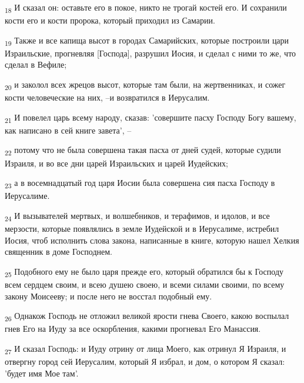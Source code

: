 \begin{tcolorbox}
\textsubscript{18} И сказал он: оставьте его в покое, никто не трогай костей его. И сохранили кости его и кости пророка, который приходил из Самарии.
\end{tcolorbox}
\begin{tcolorbox}
\textsubscript{19} Также и все капища высот в городах Самарийских, которые построили цари Израильские, прогневляя [Господа], разрушил Иосия, и сделал с ними то же, что сделал в Вефиле;
\end{tcolorbox}
\begin{tcolorbox}
\textsubscript{20} и заколол всех жрецов высот, которые там были, на жертвенниках, и сожег кости человеческие на них, --и возвратился в Иерусалим.
\end{tcolorbox}
\begin{tcolorbox}
\textsubscript{21} И повелел царь всему народу, сказав: 'совершите пасху Господу Богу вашему, как написано в сей книге завета', --
\end{tcolorbox}
\begin{tcolorbox}
\textsubscript{22} потому что не была совершена такая пасха от дней судей, которые судили Израиля, и во все дни царей Израильских и царей Иудейских;
\end{tcolorbox}
\begin{tcolorbox}
\textsubscript{23} а в восемнадцатый год царя Иосии была совершена сия пасха Господу в Иерусалиме.
\end{tcolorbox}
\begin{tcolorbox}
\textsubscript{24} И вызывателей мертвых, и волшебников, и терафимов, и идолов, и все мерзости, которые появлялись в земле Иудейской и в Иерусалиме, истребил Иосия, чтоб исполнить слова закона, написанные в книге, которую нашел Хелкия священник в доме Господнем.
\end{tcolorbox}
\begin{tcolorbox}
\textsubscript{25} Подобного ему не было царя прежде его, который обратился бы к Господу всем сердцем своим, и всею душею своею, и всеми силами своими, по всему закону Моисееву; и после него не восстал подобный ему.
\end{tcolorbox}
\begin{tcolorbox}
\textsubscript{26} Однакож Господь не отложил великой ярости гнева Своего, какою воспылал гнев Его на Иуду за все оскорбления, какими прогневал Его Манассия.
\end{tcolorbox}
\begin{tcolorbox}
\textsubscript{27} И сказал Господь: и Иуду отрину от лица Моего, как отринул Я Израиля, и отвергну город сей Иерусалим, который Я избрал, и дом, о котором Я сказал: 'будет имя Мое там'.
\end{tcolorbox}

